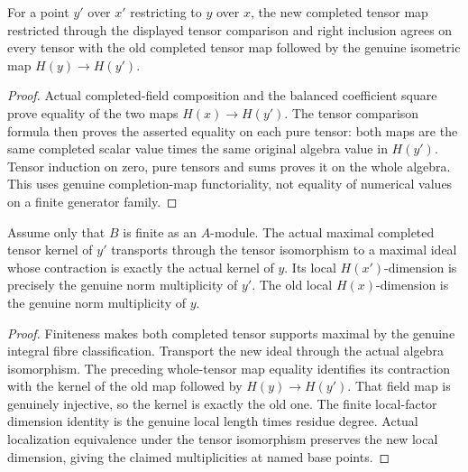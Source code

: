 \begin{theorem}
\label{spectrum:completed-fibre-base-change-naturality}
\leanok
{}
For a point $y'$ over $x'$ restricting to $y$ over $x$, the new completed
tensor map restricted through the displayed tensor comparison and right
inclusion agrees on every tensor with the old completed tensor map followed
by the genuine isometric map $H(y)\to H(y')$.
\end{theorem}
\begin{proof}
Actual completed-field composition and the balanced coefficient square
prove equality of the two maps $H(x)\to H(y')$. The tensor comparison
formula then proves the asserted equality on each pure tensor: both maps
are the same completed scalar value times the same original algebra
value in $H(y')$. Tensor induction on zero, pure tensors and sums proves
it on the whole algebra. This uses genuine completion-map functoriality,
not equality of numerical values on a finite generator family.
\end{proof}

\begin{theorem}
\label{spectrum:completed-fibre-base-change-support}
\leanok
{}
Assume only that $B$ is finite as an $A$-module. The actual maximal
completed tensor kernel of $y'$ transports through the tensor isomorphism
to a maximal ideal whose contraction is exactly the actual kernel of $y$.
Its local $H(x')$-dimension is precisely the genuine norm multiplicity of
$y'$. The old local $H(x)$-dimension is the genuine norm multiplicity of $y$.
\end{theorem}
\begin{proof}
Finiteness makes both completed tensor supports maximal by the genuine
integral fibre classification. Transport the new ideal through the actual
algebra isomorphism. The preceding whole-tensor map equality identifies its
contraction with the kernel of the old map followed by $H(y)\to H(y')$.
That field map is genuinely injective, so the kernel is exactly the old
one. The finite local-factor dimension identity is the genuine local
length times residue degree. Actual localization equivalence under the
tensor isomorphism preserves the new local dimension, giving the claimed
multiplicities at named base points.
\end{proof}

